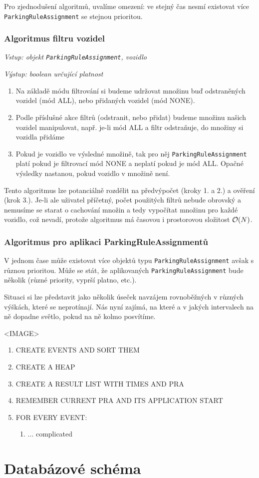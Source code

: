 Pro zjednodušení algoritmů, uvalíme omezení: ve stejný čas nesmí existovat více \texttt{ParkingRuleAssignment}
se stejnou prioritou.

\subsubsection*{Algoritmus filtru vozidel}

\textit{Vstup: objekt \texttt{ParkingRuleAssignment}, vozidlo}

\textit{Výstup: boolean určující platnost}
\begin{enumerate}
  \item Na základě módu filtrování si budeme udržovat množinu buď odstraněných vozidel (mód ALL), nebo přidaných vozidel (mód NONE).
  \item Podle příslušné akce filtrů (odstranit, nebo přidat) budeme množinu našich vozidel manipulovat, např. je-li mód ALL a filtr odstraňuje, do množiny si vozidla přidáme
  \item Pokud je vozidlo ve výsledné množině, tak pro něj \texttt{ParkingRuleAssignment} platí pokud je filtrovací mód NONE a neplatí pokud je mód ALL. Opačné výsledky nastanou, pokud vozidlo v množině není.
\end{enumerate}

Tento algoritmus lze potanciálně rozdělit na předvýpočet (kroky 1. a 2.) a ověření (krok 3.).
Je-li ale uživatel příčetný, počet použitých filtrů nebude obrovský a nemusíme se starat o cachování
množin a tedy vypočítat množinu pro každé vozidlo, což nevadí, protože algoritmus má časovou i prostorovou složitost
${\cal O}(N)$.

\subsubsection*{Algoritmus pro aplikaci ParkingRuleAssignmentů}

V jednom čase může existovat více objektů typu \texttt{ParkingRuleAssignment} avšak s různou prioritou.
Může se stát, že aplikovaných \texttt{ParkingRuleAssignment} bude několik (různé priority, vyprší platno, etc.).

Situaci si lze představit jako několik úseček navzájem rovnoběžných v různých výškách, které se neprotínají.
Nás nyní zajímá, na které a v jakých intervalech na ně dopadne světlo, pokud na ně kolmo posvítíme.

<IMAGE>

\begin{enumerate}
  \item CREATE EVENTS AND SORT THEM
  \item CREATE A HEAP
  \item CREATE A RESULT LIST WITH TIMES AND PRA
  \item REMEMBER CURRENT PRA AND ITS APPLICATION START
  \item FOR EVERY EVENT:
  \begin{enumerate}
    \item ... complicated
  \end{enumerate}
\end{enumerate}

\section{Databázové schéma} \label{db_schema}
